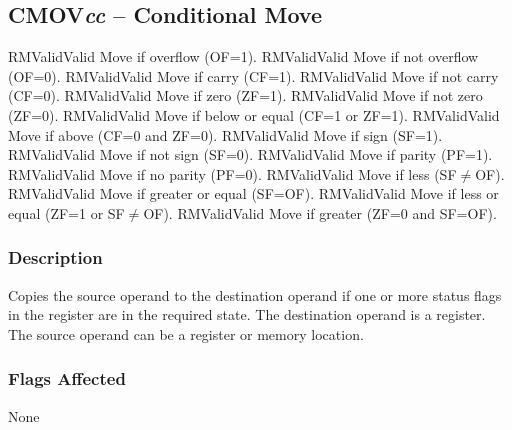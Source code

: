 \clearpage
{}
{}
\subsection*{CMOV\emph{cc} -- Conditional Move}

\begin{x86opcodetable}
  {RM}{Valid}{Valid}
  {Move if overflow (OF=1).}
  {RM}{Valid}{Valid}
  {Move if not overflow (OF=0).}
  {RM}{Valid}{Valid}
  {Move if carry (CF=1).}
  {RM}{Valid}{Valid}
  {Move if not carry (CF=0).}
  {RM}{Valid}{Valid}
  {Move if zero (ZF=1).}
  {RM}{Valid}{Valid}
  {Move if not zero (ZF=0).}
  {RM}{Valid}{Valid}
  {Move if below or equal (CF=1 or ZF=1).}
  {RM}{Valid}{Valid}
  {Move if above (CF=0 and ZF=0).}
  {RM}{Valid}{Valid}
  {Move if sign (SF=1).}
  {RM}{Valid}{Valid}
  {Move if not sign (SF=0).}
  {RM}{Valid}{Valid}
  {Move if parity (PF=1).}
  {RM}{Valid}{Valid}
  {Move if no parity (PF=0).}
  {RM}{Valid}{Valid}
  {Move if less (SF$\neq{}$OF).}
  {RM}{Valid}{Valid}
  {Move if greater or equal (SF=OF).}
  {RM}{Valid}{Valid}
  {Move if less or equal (ZF=1 or SF$\neq{}$OF).}
  {RM}{Valid}{Valid}
  {Move if greater (ZF=0 and SF=OF).}
\end{x86opcodetable}

\begin{x86opentable}
\end{x86opentable}

\subsubsection*{Description}

Copies the source operand to the destination operand if one or more
status flags in the \RFLAGS{} register are in the required state. The
destination operand is a register.  The source operand can be a
register or memory location.

\subsubsection*{Flags Affected}

None
